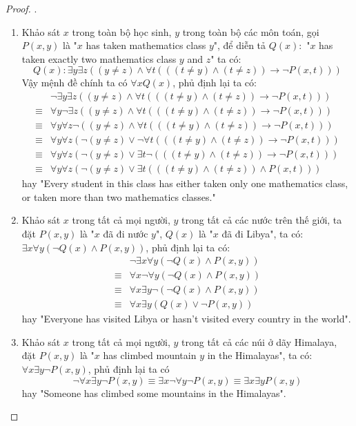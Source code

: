 \begin{proof}.
    \begin{enumerate}[label=\alph*)]
        \item Khảo sát $x$ trong toàn bộ học sinh, $y$ trong toàn bộ các môn toán, gọi $P(x,y)$ là "$x$ has taken mathematics class $y$", để diễn tả $Q(x):$ "$x$ has taken exactly two mathematics class $y$ and $z$" ta có: $$Q(x):\exists y\exists z((y\neq z)\land\forall t(((t\neq y)\land (t\neq z))\rightarrow\neg P(x,t)))$$Vậy mệnh đề chính ta có $\forall xQ(x)$, phủ định lại ta có:
        \begin{align*}
            &\neg\exists y\exists z((y\neq z)\land\forall t(((t\neq y)\land (t\neq z))\rightarrow\neg P(x,t)))\\
            \equiv& \forall y\neg\exists z((y\neq z)\land\forall t(((t\neq y)\land (t\neq z))\rightarrow\neg P(x,t)))\\
            \equiv&\forall y\forall z\neg((y\neq z)\land\forall t(((t\neq y)\land (t\neq z))\rightarrow\neg P(x,t)))\\
            \equiv&\forall y\forall z(\neg(y\neq z)\lor\neg\forall t(((t\neq y)\land (t\neq z))\rightarrow\neg P(x,t)))\\
            \equiv&\forall y\forall z(\neg(y\neq z)\lor\exists t\neg(((t\neq y)\land (t\neq z))\rightarrow\neg P(x,t)))\\
            \equiv&\forall y\forall z(\neg(y\neq z)\lor\exists t(((t\neq y)\land (t\neq z))\land P(x,t)))
        \end{align*} hay "Every student in this class has either taken only one mathematics class, or taken more than two mathematics classes."
        \item Khảo sát $x$ trong tất cả mọi người, $y$ trong tất cả các nước trên thế giới, ta đặt $P(x,y)$ là "$x$ đã đi nước $y$", $Q(x)$ là "$x$ đã đi Libya", ta có: $\exists x\forall y(\neg Q(x)\land P(x,y))$, phủ định lại ta có:
        \begin{align*}
            &\neg\exists x\forall y(\neg Q(x)\land P(x,y))\\
            \equiv& \forall x\neg\forall y(\neg Q(x)\land P(x,y))\\
            \equiv& \forall x\exists y\neg(\neg Q(x)\land P(x,y))\\
            \equiv& \forall x\exists y(Q(x)\lor\neg P(x,y))
        \end{align*}hay "Everyone has visited Libya or hasn't visited every country in the world".
        \item Khảo sát $x$ trong tất cả mọi người, $y$ trong tất cả các núi ở dãy Himalaya, đặt $P(x,y)$ là "$x$ has climbed mountain $y$ in the Himalayas", ta có: $\forall x\exists y\neg P(x,y)$, phủ định lại ta có $$\neg\forall x\exists y\neg P(x,y)\equiv \exists x\neg\forall y\neg P(x,y)\equiv\exists x\exists yP(x,y)$$hay "Someone has climbed some mountains in the Himalayas".

\end{enumerate}
\end{proof}
